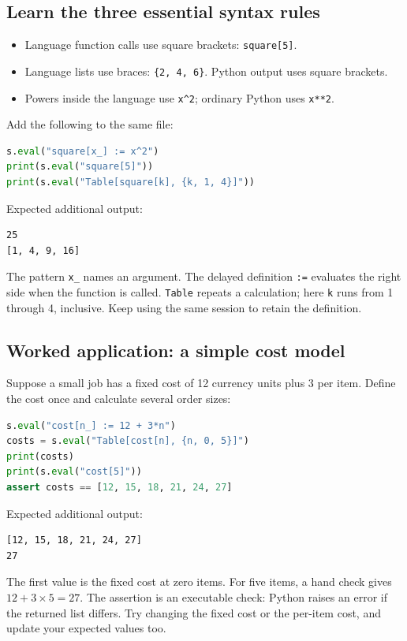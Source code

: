\subsection{Learn the three essential syntax rules}
\begin{itemize}
\item Language function calls use square brackets: \texttt{square[5]}.
\item Language lists use braces: \texttt{\{2, 4, 6\}}. Python output uses square brackets.
\item Powers inside the language use \texttt{x\^{}2}; ordinary Python uses \texttt{x**2}.
\end{itemize}
Add the following to the same file:
\begin{lstlisting}[language=Python]
s.eval("square[x_] := x^2")
print(s.eval("square[5]"))
print(s.eval("Table[square[k], {k, 1, 4}]"))
\end{lstlisting}
Expected additional output:
\begin{lstlisting}
25
[1, 4, 9, 16]
\end{lstlisting}
The pattern \texttt{x\_} names an argument. The delayed definition \texttt{:=} evaluates the right side when the function is called. \texttt{Table} repeats a calculation; here \texttt{k} runs from 1 through 4, inclusive. Keep using the same session to retain the definition.

\subsection{Worked application: a simple cost model}
Suppose a small job has a fixed cost of 12 currency units plus 3 per item. Define the cost once and calculate several order sizes:
\begin{lstlisting}[language=Python]
s.eval("cost[n_] := 12 + 3*n")
costs = s.eval("Table[cost[n], {n, 0, 5}]")
print(costs)
print(s.eval("cost[5]"))
assert costs == [12, 15, 18, 21, 24, 27]
\end{lstlisting}
Expected additional output:
\begin{lstlisting}
[12, 15, 18, 21, 24, 27]
27
\end{lstlisting}
The first value is the fixed cost at zero items. For five items, a hand check gives $12+3\times5=27$. The assertion is an executable check: Python raises an error if the returned list differs. Try changing the fixed cost or the per-item cost, and update your expected values too.

